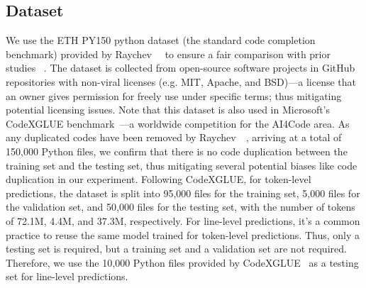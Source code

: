 \subsection{Dataset}\label{dataset}

We use the ETH PY150 python dataset (the standard code completion benchmark) provided by Raychev~\ea~\cite{raychev2016probabilistic} to ensure a fair comparison with prior studies ~\cite{kim2021code, izadi2022codefill, li2017code, wang2020towards}.
The dataset is collected from open-source software projects in GitHub repositories with non-viral licenses (e.g. MIT, Apache, and BSD)---a license that an owner gives permission for freely use under specific terms; thus mitigating potential licensing issues.
Note that this dataset is also used in Microsoft's CodeXGLUE benchmark~\cite{lu2021codexglue}---a worldwide competition for the AI4Code area.
As any duplicated codes have been removed by Raychev~\ea~\cite{raychev2016probabilistic}, arriving at a total of 150,000 Python files, we confirm that there is no code duplication between the training set and the testing set, thus  mitigating several potential biases like code duplication in our experiment.
Following CodeXGLUE, for token-level predictions, the dataset is split into 95,000 files for the training set, 5,000 files for the validation set, and 50,000 files for the testing set, with the number of tokens of 72.1M, 4.4M, and 37.3M, respectively.
For line-level predictions, it's a common practice to reuse the same model trained for token-level predictions. 
Thus, only a testing set is required, but a training set and a validation set are not required.
Therefore, we use the 10,000 Python files provided by CodeXGLUE~\cite{lu2021codexglue} as a testing set for line-level predictions.







